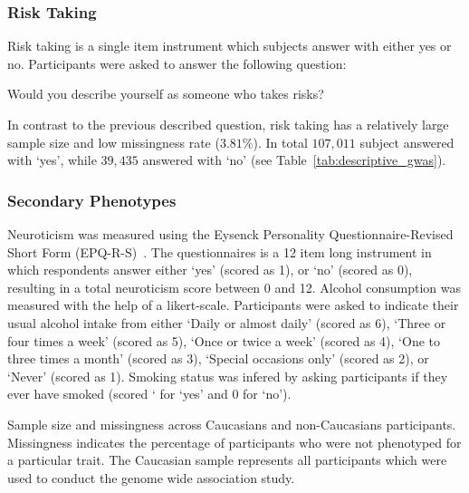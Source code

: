 \subsubsection{Risk Taking}
\label{ssub:risk_taking}
Risk taking is a single item instrument which subjects answer with either yes or no.
Participants were asked to answer the following question:
\begin{displayquote}
  Would you describe yourself as someone who takes risks?
\end{displayquote}
In contrast to the previous described question, risk taking has a relatively large sample size and low missingness rate ($3.81\%$).
In total $107,011$ subject answered with `yes', while $39,435$ answered with `no' (see Table~\ref{tab:descriptive_gwas}).

\subsubsection{Secondary Phenotypes}
\label{ssub:sec_pheno}

Neuroticism was measured using the Eysenck Personality Questionnaire-Revised Short Form (EPQ-R-S)~\cite{Eysenck1985}. 
The questionnaires is a 12 item long instrument in which respondents answer either `yes' (scored as 1), or `no' (scored as 0),
resulting in a total neuroticism score between 0 and 12.
Alcohol consumption was measured with the help of a likert-scale.
Participants were asked to indicate their usual alcohol intake from either `Daily or almost daily' (scored as 6), `Three or four times a week' (scored as 5), `Once or twice a week' (scored as 4), `One to three times a month' (scored as 3), `Special occasions only' (scored as 2), or `Never' (scored as 1).
Smoking status was infered by asking participants if they ever have smoked (scored ` for `yes' and 0 for `no').


\begin{table}[!htpb]
	\centering
	\resizebox{\textwidth}{!}{}
  \caption{
    Sample size and missingness across Caucasians and non-Caucasians participants.
    Missingness indicates the percentage of participants who were not phenotyped for a particular trait.
    The Caucasian sample represents all participants which were used to conduct the genome wide association study.
}\label{tab:descriptive_gwas} 
\end{table}

